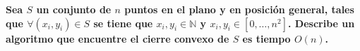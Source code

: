 \textbf{Sea $S$ un conjunto de $n$ puntos en el plano y en posici\'on general, tales que $\forall (x_i, y_i) \in S$ se tiene que $x_i,y_i \in \mathbb{N}$ y $x_i, y_i \in [0, \dots, n^2]$. Describe un algoritmo que encuentre el cierre convexo de $S$ es tiempo $O(n)$.
}\vspace{.2cm}

\textcolor{bibi}{}
\begin{quote}
\end{quote}
